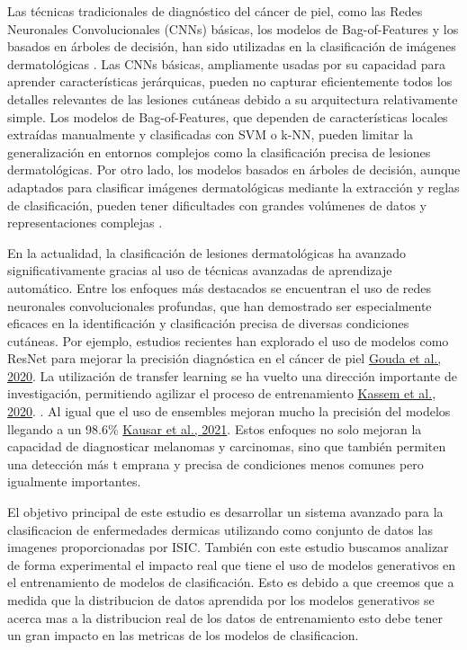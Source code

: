 \documentclass[12pt]{article}
\begin{document}
Las técnicas tradicionales de diagnóstico del cáncer de piel, como las Redes Neuronales Convolucionales (CNNs) básicas, los 
modelos de Bag-of-Features y los basados en árboles de decisión, han sido utilizadas en la clasificación de imágenes 
dermatológicas \cite{gulshan2016, esteva2017, brinker2019}. Las CNNs básicas, ampliamente usadas por su capacidad para aprender 
características jerárquicas, pueden no capturar eficientemente todos los detalles relevantes de las lesiones cutáneas debido a 
su arquitectura relativamente simple. Los modelos de Bag-of-Features, que dependen de características locales extraídas 
manualmente y clasificadas con SVM o k-NN, pueden limitar la generalización en entornos complejos como la clasificación 
precisa de lesiones dermatológicas. Por otro lado, los modelos basados en árboles de decisión, aunque adaptados para clasificar 
imágenes dermatológicas mediante la extracción y reglas de clasificación, pueden tener dificultades con grandes volúmenes de 
datos y representaciones complejas \cite{esteva2017}.

En la actualidad, la clasificación de lesiones dermatológicas ha avanzado significativamente gracias al uso de técnicas avanzadas 
de aprendizaje automático. Entre los enfoques más destacados se encuentran el uso de redes neuronales convolucionales profundas, 
que han demostrado ser especialmente eficaces en la identificación y clasificación precisa de diversas condiciones cutáneas. 
Por ejemplo, estudios recientes han explorado el uso de modelos como ResNet para mejorar la precisión diagnóstica en el cáncer 
de piel \href{https://www.semanticscholar.org/paper/Skin-Cancer-Classification-using-ResNet-Gouda-Amudha/9f69195d3701818cca0ff1f9f3c1580c501fd3af}{Gouda et al., 2020}. 
La utilización de transfer learning se ha vuelto una dirección importante de investigación, permitiendo
agilizar el proceso de entrenamiento \href{https://www.semanticscholar.org/paper/Skin-Lesions-Classification-Into-Eight-Classes-for-Kassem-Hosny/d93c65722d2e43ea9bc4e0ccd70d9357985fc145}{Kassem et al., 2020}. 
. Al igual que el uso de ensembles mejoran mucho la precisión del modelos llegando a un 98.6\% \href{https://www.mdpi.com/2076-3417/11/22/10593}{Kausar et al., 2021}.
Estos enfoques no solo mejoran la capacidad de diagnosticar melanomas y carcinomas, sino que también permiten una detección más t
emprana y precisa de condiciones menos comunes pero igualmente importantes.

El objetivo principal de este estudio es desarrollar un sistema avanzado para la clasificacion de enfermedades dermicas utilizando 
como conjunto de datos las imagenes proporcionadas por ISIC. También con este estudio buscamos analizar de forma experimental el 
impacto real que tiene el uso de modelos generativos en el entrenamiento de modelos de clasificación. Esto es debido a que creemos 
que a medida que la distribucion de datos aprendida por los modelos generativos se acerca mas a la distribucion real de los datos 
de entrenamiento esto debe tener un gran impacto en las metricas de los modelos de clasificacion.
\end{document}
